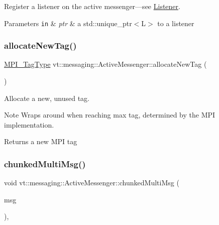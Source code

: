 Register a listener on the active messenger---see {\ttfamily \hyperlink{structvt_1_1messaging_1_1_listener}{Listener}}. 


\begin{DoxyParams}[1]{Parameters}
\mbox{\tt in}  & {\em ptr} & a {\ttfamily std\+::unique\+\_\+ptr$<$\+L$>$} to a listener \\
\hline
\end{DoxyParams}
\mbox{\label{structvt_1_1messaging_1_1_active_messenger_af2339f3300276bdc7e55706ce0cfff2a}} 
\subsubsection{\texorpdfstring{allocate\+New\+Tag()}{allocateNewTag()}}
{\footnotesize\ttfamily \hyperlink{namespacevt_1_1messaging_af700cb74b7b97c1a305267a9eb3ba91a}{M\+P\+I\+\_\+\+Tag\+Type} vt\+::messaging\+::\+Active\+Messenger\+::allocate\+New\+Tag (\begin{DoxyParamCaption}{ }\end{DoxyParamCaption})\hspace{0.3cm}{\ttfamily [private]}}



Allocate a new, unused tag. 

\begin{DoxyNote}{Note}
Wraps around when reaching max tag, determined by the M\+PI implementation.
\end{DoxyNote}
\begin{DoxyReturn}{Returns}
a new M\+PI tag 
\end{DoxyReturn}
\mbox{\label{structvt_1_1messaging_1_1_active_messenger_ae8f6417a532c73601f9c26190a29a21e}} 
\subsubsection{\texorpdfstring{chunked\+Multi\+Msg()}{chunkedMultiMsg()}}
{\footnotesize\ttfamily void vt\+::messaging\+::\+Active\+Messenger\+::chunked\+Multi\+Msg (\begin{DoxyParamCaption}\item[{\hyperlink{structvt_1_1messaging_1_1_multi_msg}{Multi\+Msg} $\ast$}]{msg }\end{DoxyParamCaption})\hspace{0.3cm}{\ttfamily [static]}, {\ttfamily [private]}}



